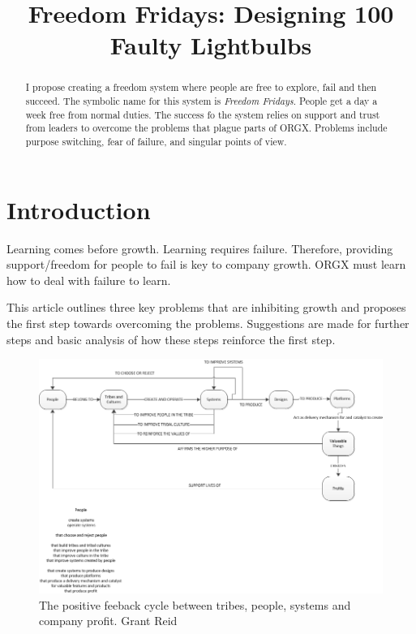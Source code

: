 \documentclass[conference]{IEEEtran}
\begin{document}
\title{Freedom Fridays: Designing 100 Faulty Lightbulbs}

\author{
}

\maketitle

\begin{abstract}
I propose creating a freedom system where people are free to explore, fail and
then succeed. The symbolic name for this system is \emph{Freedom Fridays}.
People get a day a week free from normal duties. The success fo the system
relies on support and trust from leaders to overcome the problems that plague
parts of ORGX. Problems include purpose switching, fear of failure, and singular
points of view.
\end{abstract}

\section{Introduction}
Learning comes before growth. Learning requires failure. Therefore, providing
support/freedom for people to fail is key to company growth. ORGX must
learn how to deal with failure to learn. 

This article outlines three key problems that are inhibiting growth and
proposes the first step towards overcoming the problems. Suggestions are made
for further steps and basic analysis of how these steps reinforce the first
step.

\begin{figure}[!t]
\centering
\includegraphics[width=\textwidth]{SystemCreation.png}
\caption{The positive feeback cycle between tribes, people, systems and company profit. \textcopyright Grant Reid}
\label{fig:peoplesystems}
\end{figure}
\end{document}
